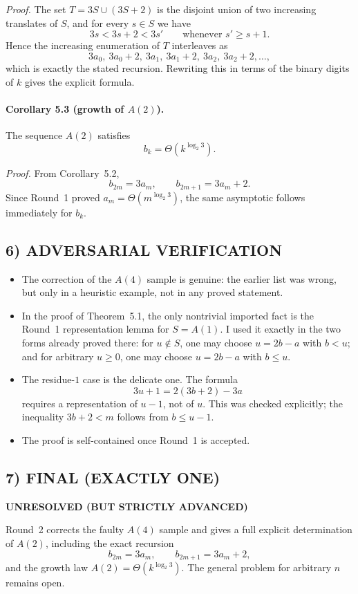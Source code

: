 \emph{Proof.}
The set $T=3S\cup(3S+2)$ is the disjoint union of two increasing translates of $S$, and for every $s\in S$ we have
\[
3s<3s+2<3s'
\qquad\text{whenever } s'\ge s+1.
\]
Hence the increasing enumeration of $T$ interleaves as
\[
3a_0,\ 3a_0+2,\ 3a_1,\ 3a_1+2,\ 3a_2,\ 3a_2+2,\dots,
\]
which is exactly the stated recursion. Rewriting this in terms of the binary digits of $k$ gives the explicit formula. 

\paragraph{Corollary 5.3 (growth of $A(2)$).}
The sequence $A(2)$ satisfies
\[
b_k=\Theta(k^{\log_2 3}).
\]

\emph{Proof.}
From Corollary~5.2,
\[
b_{2m}=3a_m,
\qquad
b_{2m+1}=3a_m+2.
\]
Since Round~1 proved $a_m=\Theta(m^{\log_2 3})$, the same asymptotic follows immediately for $b_k$. 

\subsection*{6) ADVERSARIAL VERIFICATION}
\begin{itemize}
\item The correction of the $A(4)$ sample is genuine: the earlier list was wrong, but only in a heuristic example, not in any proved statement.
\item In the proof of Theorem~5.1, the only nontrivial imported fact is the Round~1 representation lemma for $S=A(1)$. I used it exactly in the two forms already proved there: for $u\notin S$, one may choose $u=2b-a$ with $b<u$; and for arbitrary $u\ge 0$, one may choose $u=2b-a$ with $b\le u$.
\item The residue-$1$ case is the delicate one. The formula
\[
3u+1=2(3b+2)-3a
\]
requires a representation of $u-1$, not of $u$. This was checked explicitly; the inequality $3b+2<m$ follows from $b\le u-1$.
\item The proof is self-contained once Round~1 is accepted.
\end{itemize}

\subsection*{7) FINAL (EXACTLY ONE)}
\textbf{UNRESOLVED (BUT STRICTLY ADVANCED)}

Round~2 corrects the faulty $A(4)$ sample and gives a full explicit determination of $A(2)$, including the exact recursion
\[
b_{2m}=3a_m,
\qquad
b_{2m+1}=3a_m+2,
\]
and the growth law $A(2)=\Theta(k^{\log_2 3})$. The general problem for arbitrary $n$ remains open.

